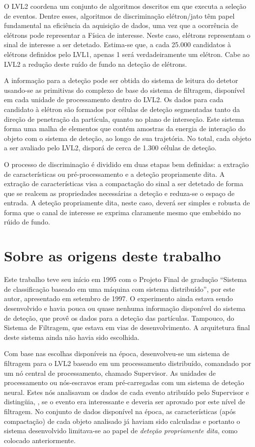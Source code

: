 O LVL2 coordena um conjunto de algoritmos descritos em  que
executa a seleção de eventos. Dentre esses, algoritmos de discriminação
elétron/jato têm papel fundamental na eficiência da aquisição de dados, uma
vez que a ocorrência de elétrons pode representar a Física de interesse. Neste
caso, elétrons representam o sinal de interesse a ser detetado. Estima-se que,
a cada 25.000 candidatos à elétrons definidos pelo LVL1, apenas 1 será
verdadeiramente um elétron. Cabe ao LVL2 a redução deste ruído de fundo na
deteção de elétrons.

A informação para a deteção pode ser obtida do sistema de leitura do detetor
usando-se as primitivas do complexo  de base do sistema de
filtragem, disponível em cada unidade de processamento dentro do LVL2. Os
dados para cada candidato à elétron são formados por células de deteção
segmentadas tanto da direção de penetração da partícula, quanto no plano de
interseção. Este sistema forma uma malha de elementos que contém amostras da
energia de interação do objeto com o sistema de deteção, ao longo de sua
trajetória. No total, cada objeto a ser avaliado pelo LVL2, disporá de cerca
de 1.300 células de deteção.

O processo de discriminação é dividido em duas etapas bem definidas: a
extração de características ou pré-processamento e a deteção propriamente
dita. A extração de características visa a compactação do sinal a ser detetado
de forma que se realcem as propriedades necessárias a deteção e reduza-se o
espaço de entrada. A deteção propriamente dita, neste caso, deverá ser simples
e robusta de forma que o canal de interesse se exprima claramente mesmo que
embebido no rúido de fundo. 

\section{Sobre as origens deste trabalho}

Este trabalho teve seu início em 1995 com o Projeto Final de gradução
``Sistema de classificação baseado em uma máquina com sistema distribuído'',
por este autor, apresentado em setembro de 1997. O experimento ainda estava
sendo desenvolvido e havia pouca ou quase nenhuma informação disponível do
sistema de deteção, que provê os dados para a deteção das
partículas. Tampouco, do Sistema de Filtragem, que estava em vias de
desenvolvimento. A arquitetura final deste sistema ainda não havia sido
escolhida.

Com base nas escolhas disponíveis na época, desenvolveu-se um sistema de
filtragem para o LVL2 baseado em um processamento distribuído, comandado por
um nó central de processamento, chamado Supervisor. As unidades de
processamento ou nós-escravos eram pré-carregadas com um sistema de deteção
neural. Estes nós analisavam os dados de cada evento atribuído pelo Supervisor
e distingüia, , se o evento era interessante e deveria ser
aprovado por este nível de filtragem. No conjunto de dados disponível na
época, as características (após compactação) de cada objeto analisado já
haviam sido calculadas e portanto o sistema desenvolvido limitava-se ao papel
de \textit{deteção propriamente dita}, como colocado anteriormente.

